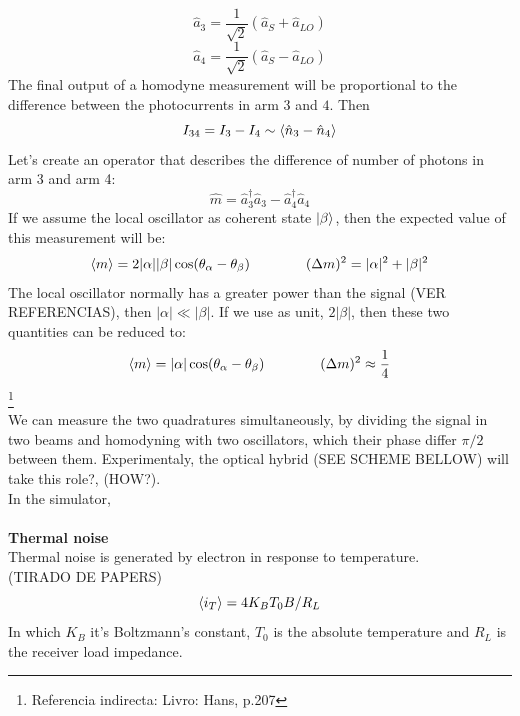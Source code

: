 $$
\hat{a}_3 = \frac{1}{\sqrt{2}} \left( \hat{a}_S + \hat{a}_{LO} \right)
$$
$$
\hat{a}_4 = \frac{1}{\sqrt{2}} \left( \hat{a}_S - \hat{a}_{LO} \right)
$$
The final output of a homodyne measurement will be proportional to the difference between the photocurrents in arm $3$ and $4$. Then
$$
I_{34} = I_3 - I_4 \sim \braket{\hat{n}_3 - \hat{n}_4}
$$
Let's create an operator that describes the difference of number of photons in arm 3 and arm 4:
$$
\hat{m} = \hat{a}^\dagger_3\hat{a}_3 - \hat{a}^\dagger_4\hat{a}_4
$$
If we assume the local oscillator as coherent state $\ket{\beta}$, then the expected value of this measurement will be:
$$
\braket{m} = 2|\alpha||\beta|\cos({\theta_\alpha - \theta_\beta})
\qquad
\qquad
(\Delta m)^2 = |\alpha|^2 + |\beta|^2
$$
The local oscillator normally has a greater power than the signal (VER REFERENCIAS), then $|\alpha| \ll |\beta|$. If we use as unit, $2|\beta|$, then these two quantities can be reduced to:
$$
\braket{m} = |\alpha|\cos({\theta_\alpha - \theta_\beta})
\qquad
\qquad
(\Delta m)^2 \approx \frac{1}{4}
$$
\footnote{Referencia indirecta: Livro: Hans, p.207}
\\
We can measure the two quadratures simultaneously, by dividing the signal in two beams and homodyning with two oscillators, which their phase differ $\pi/2$ between them.
Experimentaly, the optical hybrid (SEE SCHEME BELLOW) will take this role?, (HOW?).\\
In the simulator, 
\\
\\
{\bf Thermal noise}\\
Thermal noise is generated by electron in response to temperature.
\\
(TIRADO DE PAPERS)
$$
\braket{i_T} = 4 K_B T_0 B/R_L
$$
In which $K_B$ it's Boltzmann's constant, $T_0$ is the absolute temperature and $R_L$ is the receiver load impedance.\\
	
